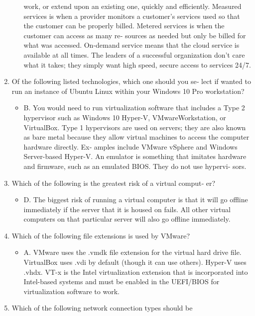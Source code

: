 \documentclass{article}
\begin{document}
\begin{enumerate}
\begin{itemize}
work, or extend upon an existing one, quickly and efficiently.
Measured services is when a provider monitors a customer’s
services used so that the customer can be properly billed.
Metered services is when the customer can access as many re‐
sources as needed but only be billed for what was accessed.
On-demand service means that the cloud service is available at
all times. The leaders of a successful organization don’t care
what it takes; they simply want high speed, secure access to
services 24/7.
    \end{itemize}
    \item Of the following listed technologies, which one should you se‐
lect if wanted to run an instance of Ubuntu Linux within your
Windows 10 Pro workstation?
    \begin{itemize}
        \item B. You would need to run virtualization software that includes
a Type 2 hypervisor such as Windows 10 Hyper-V, VMwareWorkstation, or VirtualBox. Type 1 hypervisors are used on
servers; they are also known as bare metal because they allow
virtual machines to access the computer hardware directly. Ex‐
amples include VMware vSphere and Windows Server-based
Hyper-V. An emulator is something that imitates hardware and
firmware, such as an emulated BIOS. They do not use hypervi‐
sors.
    \end{itemize}
    \item Which of the following is the greatest risk of a virtual comput‐
er?
    \begin{itemize}
        \item D. The biggest risk of running a virtual computer is that it will
go offline immediately if the server that it is housed on fails.
All other virtual computers on that particular server will also
go offline immediately.
    \end{itemize}
    \item Which of the following file extensions is used by VMware?
    \begin{itemize}
        \item A. VMware uses the .vmdk file extension for the virtual hard
drive file. VirtualBox uses .vdi by default (though it can use
others). Hyper-V uses .vhdx. VT-x is the Intel virtualization
extension that is incorporated into Intel-based systems and
must be enabled in the UEFI/BIOS for virtualization software
to work.
    \end{itemize}
    \item Which of the following network connection types should be

\end{enumerate}
\end{document}
